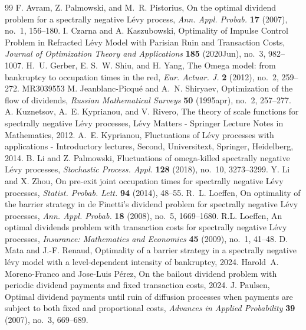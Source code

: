 \documentclass[10pt,a4paper]{amsart}
\begin{document}
\begin{thebibliography}{99}
 F. Avram, Z. Palmowski, and M.~R. Pistorius, On the optimal dividend problem for a spectrally negative {L}\'evy process, \emph{Ann. Appl. Probab.} \textbf{17} (2007), no.~1, 156--180.
 I. Czarna and A. Kaszubowski, {Optimality of Impulse Control Problem in Refracted L{\'e}vy Model with Parisian Ruin and Transaction Costs}, \emph{Journal of Optimization Theory and Applications} \textbf{185} (2020Jun), no.~3, 982--1007.
 H.~U. Gerber, E. S.~W. Shiu, and H. Yang, The {O}mega model: from bankruptcy to occupation times in the red, \emph{Eur. Actuar. J.} \textbf{2} (2012), no.~2, 259--272. MR3039553
 M. Jeanblanc-Picqué and A.~N. Shiryaev, Optimization of the flow of dividends, \emph{Russian Mathematical Surveys} \textbf{50} (1995apr), no.~2, 257--277.
 A. Kuznetsov, A.~E. Kyprianou, and V. Rivero, The theory of scale functions for spectrally negative {L}\'evy processes, {L}\'evy Matters - Springer Lecture Notes in Mathematics, 2012.
 A.~E. Kyprianou, Fluctuations of {L}\'evy processes with applications - {I}ntroductory lectures, Second, Universitext, Springer, Heidelberg, 2014.
 B. Li and Z. Palmowski, Fluctuations of omega-killed spectrally negative {L}\'{e}vy processes, \emph{Stochastic Process. Appl.} \textbf{128} (2018), no.~10, 3273--3299.
 Y. Li and X. Zhou, On pre-exit joint occupation times for spectrally negative {L}\'{e}vy processes, \emph{Statist. Probab. Lett.} \textbf{94} (2014), 48--55.
 R.~L. Loeffen, On optimality of the barrier strategy in de {F}inetti's dividend problem for spectrally negative {L}\'{e}vy processes, \emph{Ann. Appl. Probab.} \textbf{18} (2008), no.~5, 1669--1680.
 R.L. Loeffen, {An optimal dividends problem with transaction costs for spectrally negative Lévy processes}, \emph{Insurance: Mathematics and Economics} \textbf{45} (2009), no.~1, 41--48.
 D. Mata and J.-F. Renaud, Optimality of a barrier strategy in a spectrally negative l\'evy model with a level-dependent intensity of bankruptcy, 2024.
 Harold~A. Moreno-Franco and Jose-Luis Pérez, On the bailout dividend problem with periodic dividend payments and fixed transaction costs, 2024.
 J. Paulsen, Optimal dividend payments until ruin of diffusion processes when payments are subject to both fixed and proportional costs, \emph{Advances in Applied Probability} \textbf{39} (2007), no.~3, 669–689.

\end{thebibliography}
\end{document}
